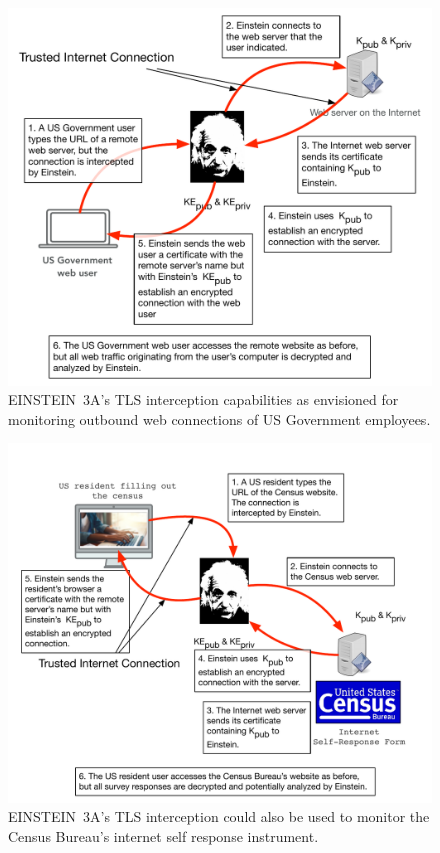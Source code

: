 \documentclass[fleqn,12pt]{wlscirep}
\begin{document}
\begin{figure}
  \includegraphics[width=\textwidth]{art/emonitoring1.pdf}
  \caption{EINSTEIN~3A's TLS interception capabilities as envisioned
    for monitoring outbound web connections of US Government employees.}\label{emonitoring1}
  \end{figure}

\begin{figure}
  \includegraphics[width=\textwidth]{art/emonitoring2.pdf}
  \caption{EINSTEIN~3A's TLS interception could also be used to monitor the
    Census Bureau's internet self response instrument.}\label{emonitoring2}
  \end{figure}
\end{document}
